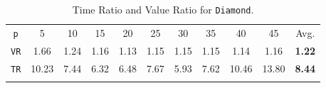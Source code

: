 \begin{table}[h]																	
 \centering
 \small
 \setlength{\tabcolsep}{4.0pt}
 \renewcommand \arraystretch{1.8}
\begin{tabular}{ccccccccccc}																					
\texttt{p}	&	5	&	10	&	15	&	20	&	25	&	30	&	35	&	40	&	45	&	Avg.	\\	
\cmidrule(lr){1-1} \cmidrule(lr){2-10} \cmidrule(lr){11-11}
\texttt{VR} &	1.66	&	1.24	&	1.16	&	1.13	&	1.15	&	1.15	&	1.15	&	1.14	&	1.16	&	\textbf{1.22}	\\	
\texttt{TR} &	10.23	&	7.44	&	6.32	&	6.48	&	7.67	&	5.93	&	7.62	&	10.46	&	13.80	&	\textbf{8.44}	\\	\\
\end{tabular}
\caption{Time Ratio and Value Ratio for \texttt{Diamond}.}														\label{tab:diamond}								
\end{table}																						






